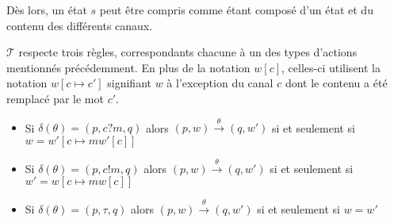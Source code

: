 Dès lors, un état $s$ peut être compris comme étant composé d'un état et du contenu des différents canaux.

$\mathcal{T}$ respecte trois règles, correspondants chacune à un des types d'actions mentionnés précédemment. En plus de la notation $w[c]$, celles-ci utilisent la notation $w[c\mapsto c']$ signifiant $w$ à l'exception du canal $c$ dont le contenu a été remplacé par le mot $c'$.
\begin{itemize}
  \item Si $\delta(\theta)=(p,c?m,q)$ alors $(p,w)\xrightarrow{\theta}(q,w')$ si et seulement si $w=w'[c\mapsto mw'[c]]$
  \item Si $\delta(\theta)=(p,c!m,q)$ alors $(p,w)\xrightarrow{\theta}(q,w')$ si et seulement si $w'=w[c\mapsto mw[c]]$
  \item Si $\delta(\theta)=(p,\tau,q)$ alors $(p,w)\xrightarrow{\theta}(q,w')$ si et seulement si $w=w'$
\end{itemize}




